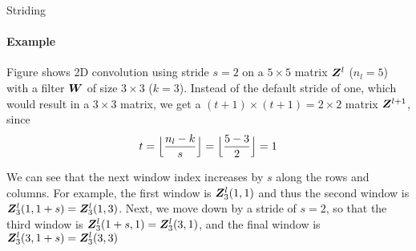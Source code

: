 \begin{frame}{Striding}
\framesubtitle{Example}
Figure shows 2D convolution using stride $s=2$
    on a $5 \times 5$ matrix $\bZ^l$ ($n_l=5$) with a filter $\bW$ of size $3
    \times 3$ ($k=3$).
    Instead of the default stride of one, which would result in a $3
    \times 3$ matrix, we get a $(t+1) \times (t+1) = 2 \times 2$ matrix
    $\bZ^{l+1}$, since
    \begin{align*}
        t=\floor[\Big]{\frac{n_l-k}{s}} = \floor[\Big]{\frac{5-3}{2}} = 1
    \end{align*}

    We can see that the next window index increases by $s$ along the rows
    and columns. For example, the first window is $\bZ^l_3(1,1)$ and
    thus the second window is $\bZ^l_3(1,1+s) = \bZ^l_3(1,3)$.
    Next, we move down by a stride of
    $s=2$, so that the third window is $\bZ^l_3(1+s,1) = \bZ^l_3(3,1)$,
    and the final window is $\bZ^l_3(3,1+s)
    = \bZ^l_3(3,3)$ %
\end{frame}
%
%
